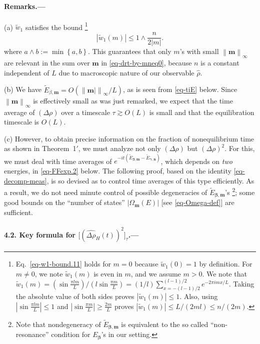 \documentclass[aps,prl,superscriptaddress,reprint]{revtex4-2}
\newcommand{\se}[1]{\paragraph{#1.---}}
\theoremstyle{definition}
\newcommand{\abs}[1]{{\left\vert #1 \right\vert}}
\newcommand{\brac}[1]{{\left\{ #1 \right\}}}
\newcommand{\bigbrak}[1]{\bigl[{#1}\bigr]}
\newcommand{\ti}{\tilde}
\newcommand{\ha}{\hat}
\newcommand{\wh}{\widehat}
\newcommand{\ta}{\tau}
\renewcommand{\b}{\beta}
\renewcommand{\c}{\gamma}
\newcommand{\De}{\varDelta}
\renewcommand{\r}{\rho}
\newcommand{\f}{\frac}
\newcommand{\ve}[1]{\boldsymbol{#1}}
\newcommand{\we}{\wedge}
\newcommand{\norminf}[1]{\left\|#1\right\|_\infty}
\renewcommand{\geq}{\geqslant}
\renewcommand{\le}{\leqslant}
\renewcommand{\leq}{\leqslant}
\newcommand{\bb}{{\ve \b}}
\newcommand{\cc}{{\ve \c}}
\newcommand{\mm}{{\ve m}}
\newcommand{\timescale}{timescale}
\begin{document}
\se{Remarks}
(a)
$\ti w_1$ satisfies the bound
\footnote{
  Eq.~\eqref{eq-w1-bound.11} holds for $m=0$
  because $\ti w_1(0) = 1$ by definition.
  For $m \neq 0$, we note $\ti w_1(m)$ is even in $m$, and we assume $m >0$.
  We note that $\ti w_1(m) = (\sin\f{\pi l m}L)/(l\sin\f{\pi m}L)
  = (1/l) \sum_{x=-(l-1)/2}^{(l-1)/2} e^{- 2 \pi i m x/L}$.
  Taking the absolute value of both sides proves $|\ti w_1(m)| \leq 1$.
  Also, using $|\sin\f{\pi l m}L| \leq 1$ and $|\sin\f{\pi m}L | \geq \frac{2m}{L}$
  proves $|\ti w_1(m)| \leq L/(2 m l) \leq n/(2m)$.
}
\begin{equation}
	\abs{\ti w_1(m)}
	\le 1\we \f n{2\abs{m}}.
	\label{eq-w1-bound.11}
\end{equation}
where $a\we b:=\min\brac{a,b}$.
This
guarantees that only
$m$'s with small $\norminf{\mm}$ are relevant in the sum over $\mm$
in \eqref{eq-drt-by-mneq0},
because $n$ is a constant independent of $L$
due to macroscopic nature of our observable $\ha\r$.



(b)
We have
$\tilde{E}_{\beta, \mm} = O(\norminf{\mm|}/L)$, as is
seen from \eqref{eq-tiE} below.
Since $\norminf{\mm}$ is effectively small
as was just remarked,
we expect
that the time average of $(\De\r)$ over a {\timescale}
$\tau \gtrsim O(L)$ is small and that
the equilibration {\timescale} is
$O(L)$.



(c) However, to obtain precise information on the fraction of
nonequilibrium time
as shown in Theorem~1$'$,
we must
analyze not only $(\De\r)$ but $(\De\r)^2$.
For this, we must deal with time
averages of $e^{-it(\ti E_{\bb,\mm}-\ti E_{\cc,\ve n})}$,
which depends on \emph{two} energies,
in \eqref{eq-FFexp.2} below.
The following proof, based on the identity \eqref{eq-decomp-meas},
is so devised as to control time averages of this type efficiently.
As a result,  we do not need minute
control of possible degeneracies
of $\ti E_{\bb,\ve m}$'s \footnote{Note that nondegeneracy of  $\ti E_{\bb,\ve m}$
is equivalent to the so called ``non-resonance'' condition for $E_{\bb}$'s in our
setting.}; some good bounds on the ``number of states''
$|\Omega_{\mm}(E)|$ [see \eqref{eq-Omega-def}]
are sufficient.




\se{4.2. Key formula for $\bigbrak{ (\wh{\De\r}_H(t))^2 }_\ta$}
\end{document}
